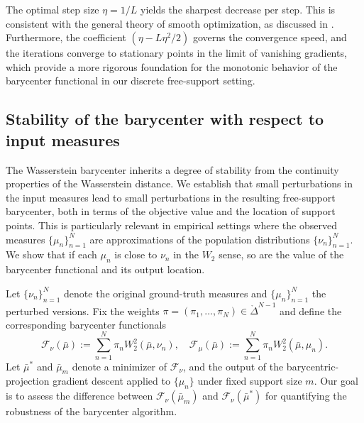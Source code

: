 \documentclass[11pt]{article}
\newcommand{\calF}{\mathcal{F}}
\begin{document}
The optimal step size $\eta = 1/L$ yields the sharpest decrease per step. This is consistent with the general theory of smooth optimization, as discussed in \cite{nesterov_2018_LecturesConvexOptimization}. Furthermore, the coefficient $(\eta - L\eta^2/2)$ governs the convergence speed, and the iterations converge to stationary points in the limit of vanishing gradients, which provide a more rigorous foundation for the monotonic behavior of the barycenter functional in our discrete free-support setting.

\subsection{Stability of the barycenter with respect to input measures}

The Wasserstein barycenter inherits a degree of stability from the continuity properties of the Wasserstein distance. We establish that small perturbations in the input measures lead to small perturbations in the resulting free-support barycenter, both in terms of the objective value and the location of support points. This is particularly relevant in empirical settings where the observed measures $\lbrace \mu_n\rbrace_{n=1}^N$ are approximations of the population distributions $\lbrace \nu_n\rbrace_{n=1}^N$. We show that if each $\mu_n$ is close to $\nu_n$ in the $W_2$ sense, so are the value of the barycenter functional and its output location.

Let $\lbrace \nu_n\rbrace_{n=1}^N$ denote the original ground-truth measures and $\lbrace \mu_n\rbrace_{n=1}^N$ the perturbed versions. Fix the weights $\pi=(\pi_1,\ldots,\pi_N)\in\mathring{\Delta}^{N-1}$ and define the corresponding barycenter functionals
\begin{equation*}
    \calF_\nu(\bar{\mu}):= \sum_{n=1}^N \pi_n W_2^2(\bar{\mu}, \nu_n),\quad \calF_\mu(\bar{\mu}) := \sum_{n=1}^N \pi_n W_2^2 (\bar{\mu}, \mu_n).
\end{equation*}
Let $\bar{\mu}^*$ and $\bar{\mu}_m$ denote a minimizer of $\calF_\nu$, and  the output of the barycentric-projection gradient descent applied to $\lbrace \mu_n\rbrace$ under fixed support size $m$. Our goal is to assess the difference between $\calF_\nu(\bar{\mu}_m)$ and $\calF_\nu(\bar{\mu}^*)$ for quantifying the robustness of the barycenter algorithm.
\end{document}
